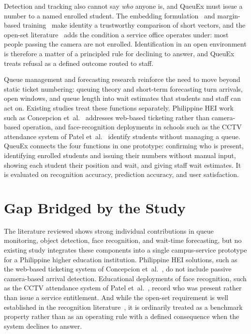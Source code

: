 \documentclass{research}
\newcommand{\sysname}{QueuEx}
\begin{document}
Detection and tracking also cannot say \emph{who} anyone is, and
\sysname{} must issue a number to a named enrolled student. The
embedding formulation~\cite{schroff2015facenet} and margin-based
training~\cite{wang2018cosface,deng2019arcface} make identity a
trustworthy comparison of short vectors, and the open-set
literature~\cite{scheirer2013openset,gunther2017opensetface} adds the
condition a service office operates under: most people passing the
camera are not enrolled. Identification in an open environment is
therefore a matter of a principled rule for declining to answer, and
\sysname{} treats refusal as a defined outcome routed to staff.

Queue management and forecasting research reinforce the need to move
beyond static ticket numbering: queuing theory and short-term
forecasting turn arrivals, open windows, and queue length into wait
estimates that students and staff can act on. Existing studies treat
these functions separately. Philippine HEI work such as Concepcion
et~al.~\cite{concepcion2026smart} addresses web-based ticketing rather
than camera-based operation, and face-recognition deployments in schools
such as the CCTV attendance system of
Patel et~al.~\cite{patel2025classroomcctv} identify students without
managing a queue. \sysname{} connects the four functions in one
prototype: confirming who is present, identifying enrolled students
and issuing their numbers without manual input, showing each student
their position and wait, and giving staff wait estimates. It is
evaluated on recognition accuracy, prediction accuracy, and user
satisfaction.

\section{Gap Bridged by the Study}
\label{cr:gap}

The literature reviewed shows strong individual contributions in queue
monitoring, object detection, face recognition, and wait-time
forecasting, but no existing study integrates these components into a
single campus-service prototype for a Philippine higher education
institution. Philippine HEI solutions, such as the web-based ticketing
system of Concepcion et~al.~\cite{concepcion2026smart}, do not include
passive camera-based arrival detection. Educational deployments of face
recognition, such as the CCTV attendance system of Patel
et~al.~\cite{patel2025classroomcctv}, record who was present rather than
issue a service entitlement. And while the open-set requirement is well
established in the recognition
literature~\cite{scheirer2013openset,gunther2017opensetface}, it is
ordinarily treated as a benchmark property rather than as an operating
rule with a defined consequence when the system declines to answer.
\end{document}
